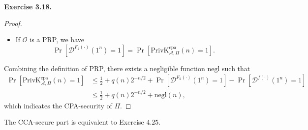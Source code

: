 \documentclass[a4paper]{article}
\newtheorem*{proof}{Proof}
\newenvironment{exercise}[1]{
	\par
	\noindent\textbf{Exercise #1.}\quad
}{
	\par
	\bigskip
}
\newcommand{\sbra}[1]{\left[ #1 \right]}
\newcommand{\PrivK}{\mathrm{PrivK}}
\newcommand{\negl}{\mathrm{negl}}
\newcommand{\cpa}{\mathrm{cpa}}
\newcommand{\Used}{\mathrm{Used}}
\begin{document}
\begin{exercise}{3.18}
\begin{proof}
\begin{itemize}
\begin{align*}
                &\leq\Pr\sbra{\Used}+\Pr\sbra{\PrivK_{\mathcal A,\widetilde\Pi}^\cpa(n)=1\middle|\overline\Used}\\
                &\leq q(n)2^{-n/2}+\frac12.
            \end{align*}
        \item If $\mathcal O$ is a PRP, we have
            $$
            \Pr\sbra{\mathcal D^{F_k(\cdot)}(1^n)=1}=\Pr\sbra{\PrivK_{\mathcal A,\Pi}^\cpa(n)=1}.
            $$
    \end{itemize}
    Combining the definition of PRP, there exists a negligible function $\negl$ such that
    \begin{align*}
        \Pr\sbra{\PrivK_{\mathcal A,\Pi}^\cpa(n)=1}&\leq\frac12+q(n)2^{-n/2}+\Pr\sbra{\mathcal D^{F_k(\cdot)}(1^n)=1}
        -\Pr\sbra{\mathcal D^{f(\cdot)}(1^n)=1}\\
        &\leq\frac12+q(n)2^{-n/2}+\negl(n),
    \end{align*}
    which indicates the CPA-security of $\Pi$.
\end{proof}
The CCA-secure part is equivalent to Exercise $4.25$.
\end{exercise}
\end{document}
